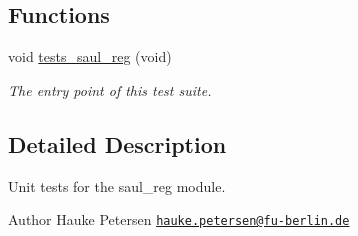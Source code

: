 \subsection*{Functions}
\begin{DoxyCompactItemize}
\item 
void \hyperlink{group__unittests_gaeae46a0be227b9113311165fc3b3752b}{tests\+\_\+saul\+\_\+reg} (void)
\begin{DoxyCompactList}\small\item\em The entry point of this test suite. \end{DoxyCompactList}\end{DoxyCompactItemize}


\subsection{Detailed Description}
Unit tests for the {\ttfamily saul\+\_\+reg} module. 

\begin{DoxyAuthor}{Author}
Hauke Petersen \href{mailto:hauke.petersen@fu-berlin.de}{\tt hauke.\+petersen@fu-\/berlin.\+de} 
\end{DoxyAuthor}
